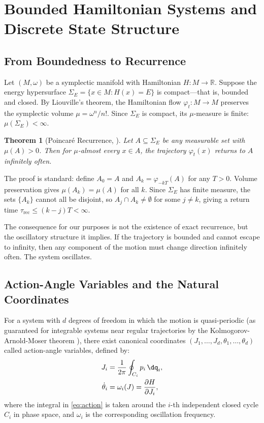 \documentclass[twocolumn,10pt]{article}
\newtheorem{theorem}{Theorem}[section]
\newcommand{\R}{\mathbb{R}}
\begin{document}
\section{Bounded Hamiltonian Systems and Discrete State Structure}
\label{sec:bounded}

\subsection{From Boundedness to Recurrence}

Let $(M, \omega)$ be a symplectic manifold with Hamiltonian $H: M \to \R$. Suppose the energy hypersurface $\Sigma_E = \{x \in M : H(x) = E\}$ is compact---that is, bounded and closed. By Liouville's theorem, the Hamiltonian flow $\varphi_t: M \to M$ preserves the symplectic volume $\mu = \omega^n/n!$. Since $\Sigma_E$ is compact, its $\mu$-measure is finite: $\mu(\Sigma_E) < \infty$.

\begin{theorem}[Poincar\'e Recurrence, \citealt{poincare1890}]
\label{thm:poincare}
Let $A \subseteq \Sigma_E$ be any measurable set with $\mu(A) > 0$. Then for $\mu$-almost every $x \in A$, the trajectory $\varphi_t(x)$ returns to $A$ infinitely often.
\end{theorem}

The proof is standard: define $A_0 = A$ and $A_k = \varphi_{-kT}(A)$ for any $T > 0$. Volume preservation gives $\mu(A_k) = \mu(A)$ for all $k$. Since $\Sigma_E$ has finite measure, the sets $\{A_k\}$ cannot all be disjoint, so $A_j \cap A_k \neq \emptyset$ for some $j \neq k$, giving a return time $\tau_{\mathrm{rec}} \leq (k-j)T < \infty$.

The consequence for our purposes is not the existence of exact recurrence, but the oscillatory structure it implies. If the trajectory is bounded and cannot escape to infinity, then any component of the motion must change direction infinitely often. The system oscillates.

\subsection{Action-Angle Variables and the Natural Coordinates}

For a system with $d$ degrees of freedom in which the motion is quasi-periodic (as guaranteed for integrable systems near regular trajectories by the Kolmogorov-Arnold-Moser theorem \citep{kolmogorov1954,arnold1963,moser1962}), there exist canonical coordinates $(J_1, \ldots, J_d, \theta_1, \ldots, \theta_d)$ called action-angle variables, defined by:
\begin{align}
    J_i &= \frac{1}{2\pi} \oint_{C_i} p_i \, \dq_i, \label{eq:action}\\
    \dot{\theta}_i &= \omega_i(J) = \frac{\partial H}{\partial J_i}, \label{eq:angle}\\
\end{align}
where the integral in \eqref{eq:action} is taken around the $i$-th independent closed cycle $C_i$ in phase space, and $\omega_i$ is the corresponding oscillation frequency.
\end{document}
